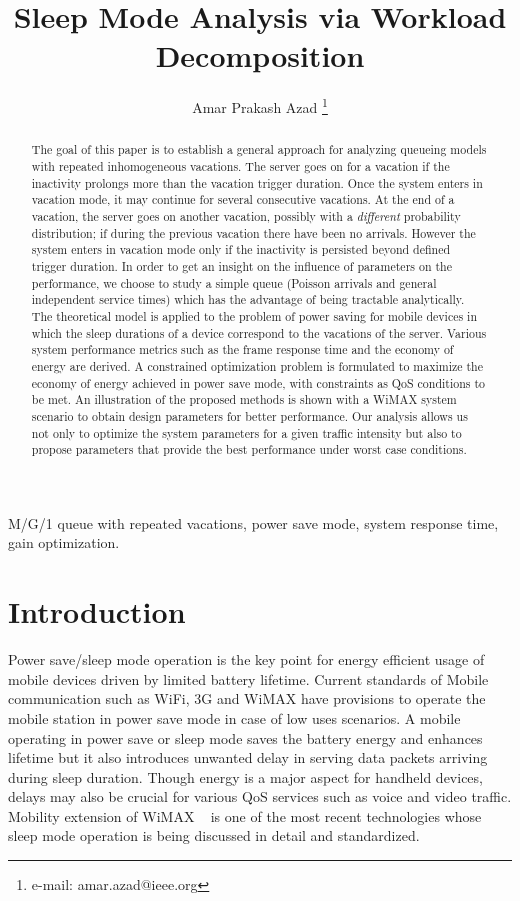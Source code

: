 \documentclass[journal]{IEEEtran}
\begin{document}
\title{ Sleep Mode Analysis via Workload Decomposition }
\author{Amar Prakash Azad \thanks{ e-mail: amar.azad@ieee.org}
}
\maketitle
\begin{abstract}
The goal of this paper is to establish a general approach for analyzing queueing models with repeated inhomogeneous vacations. The server goes on for a vacation if the inactivity prolongs more than the vacation trigger duration. Once the system enters in vacation mode, it may continue for several consecutive vacations. At the end of a vacation, the server goes on another vacation, possibly with a {\em different} probability distribution; if during the previous vacation there have been no arrivals. However the system enters in vacation mode only if the inactivity is persisted beyond defined trigger duration. In order to get an insight on the influence of parameters on the performance, we choose to study a simple  queue
(Poisson arrivals and general independent service times) which has the advantage of being tractable analytically. The theoretical model is applied to the problem of power saving for mobile devices in which the sleep durations of a device correspond to the vacations of the server. Various system performance metrics such as the frame response time and the economy of energy are derived. A constrained optimization problem is formulated to maximize the economy of energy achieved in power save mode, with constraints as QoS conditions to be met. An illustration of the proposed methods is shown with a WiMAX system scenario to obtain design parameters for better performance. Our analysis allows us not only to optimize the system parameters for a given traffic intensity but also to propose parameters that provide the best performance under worst case conditions.
\end{abstract}
\begin{IEEEkeywords}
M/G/1 queue with repeated vacations, power save mode, system
response time, gain optimization.
\end{IEEEkeywords}
\section{Introduction}
\label{s:intro}
Power save/sleep mode operation is the key point for energy efficient usage of mobile devices driven by limited battery lifetime. Current standards of Mobile communication such as WiFi, 3G and WiMAX have provisions to operate the mobile station in power save mode in case of low uses scenarios. A mobile operating in power save or sleep mode saves the battery energy and enhances lifetime but it also introduces unwanted delay in serving data packets arriving during sleep duration. Though energy is a major aspect for handheld devices, delays may also be crucial for various QoS services such as voice and video traffic. Mobility extension of WiMAX ~ \cite{man} is one of the most recent technologies whose sleep mode operation is being discussed in detail and standardized. 
\end{document}
